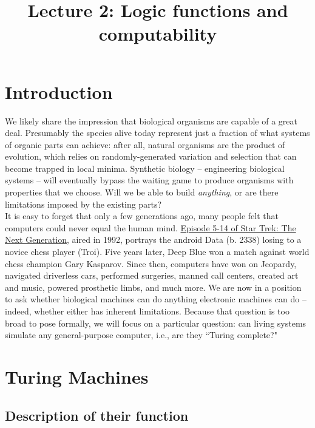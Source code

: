 \documentclass{article}
\begin{document}
\large

\title{Lecture 2: Logic functions and computability}
\maketitle

\section*{Introduction}

We likely share the impression that biological organisms are capable of a great deal. Presumably the species alive today represent just a fraction of what systems of organic parts can achieve: after all, natural organisms are the product of evolution, which relies on randomly-generated variation and selection that can become trapped in local minima. Synthetic biology -- engineering biological systems -- will eventually bypass the waiting game to produce organisms with properties that we choose. Will we be able to build \textit{anything}, or are there limitations imposed by the existing parts?\\

It is easy to forget that only a few generations ago, many people felt that computers could never equal the human mind.  \href{https://www.youtube.com/watch?v=iaMf4cb-tAc}{Episode 5-14 of Star Trek: The Next Generation}, aired in 1992, portrays the android Data (b. 2338) losing to a novice chess player (Troi). Five years later, Deep Blue won a match against world chess champion Gary Kasparov. Since then, computers have won on Jeopardy, navigated driverless cars, performed surgeries, manned call centers, created art and music, powered prosthetic limbs, and much more. We are now in a position to ask whether biological machines can do anything electronic machines can do -- indeed, whether either has inherent limitations. Because that question is too broad to pose formally, we will focus on a particular question: can living systems simulate any general-purpose computer, i.e., are they ``Turing complete?"

\section*{Turing Machines}

\subsection*{Description of their function}
\end{document}

